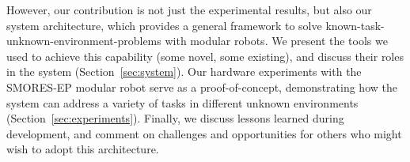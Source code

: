 \documentclass[conference]{IEEEtran}
\begin{document}
However, our contribution is not just the experimental results, but also our system architecture, which provides a general framework to solve known-task-unknown-environment-problems with modular robots.  We present the tools we used to achieve this capability (some novel, some existing), and discuss their roles in the system (Section~\ref{sec:system}).  Our hardware experiments with the SMORES-EP modular robot serve as a proof-of-concept, demonstrating how the system can address a variety of tasks in different unknown environments (Section~\ref{sec:experiments}).  Finally, we discuss lessons learned during development, and comment on challenges and opportunities for others who might wish to adopt this architecture.

%



\end{document}

